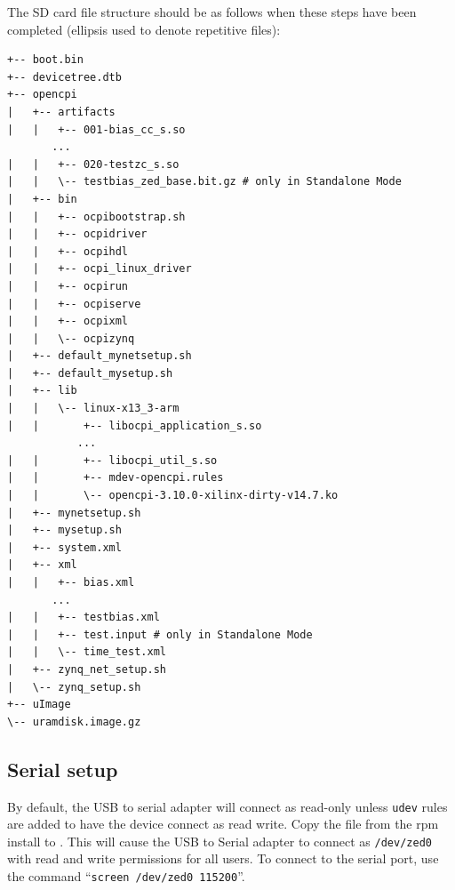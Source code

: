 \newpage
\begin{flushleft}
The SD card file structure should be as follows when these steps have been completed (ellipsis used to denote repetitive files):
\end{flushleft}
\begin{verbatim}
+-- boot.bin
+-- devicetree.dtb
+-- opencpi
|   +-- artifacts
|   |   +-- 001-bias_cc_s.so
       ...
|   |   +-- 020-testzc_s.so
|   |   \-- testbias_zed_base.bit.gz # only in Standalone Mode
|   +-- bin
|   |   +-- ocpibootstrap.sh
|   |   +-- ocpidriver
|   |   +-- ocpihdl
|   |   +-- ocpi_linux_driver
|   |   +-- ocpirun
|   |   +-- ocpiserve
|   |   +-- ocpixml
|   |   \-- ocpizynq
|   +-- default_mynetsetup.sh
|   +-- default_mysetup.sh
|   +-- lib
|   |   \-- linux-x13_3-arm
|   |       +-- libocpi_application_s.so
           ...
|   |       +-- libocpi_util_s.so
|   |       +-- mdev-opencpi.rules
|   |       \-- opencpi-3.10.0-xilinx-dirty-v14.7.ko
|   +-- mynetsetup.sh
|   +-- mysetup.sh
|   +-- system.xml
|   +-- xml
|   |   +-- bias.xml
       ...
|   |   +-- testbias.xml
|   |   +-- test.input # only in Standalone Mode
|   |   \-- time_test.xml
|   +-- zynq_net_setup.sh
|   \-- zynq_setup.sh
+-- uImage
\-- uramdisk.image.gz

\end{verbatim}

\subsection*{Serial setup}
By default, the USB to serial adapter will connect as read-only unless \texttt{udev} rules are added to have the device connect as read write.  Copy the file from the rpm install  to .  This will cause the USB to Serial adapter to connect as \texttt{/dev/zed0} with read and write permissions for all users.  To connect to the serial port, use the command ``\texttt{screen /dev/zed0 115200}''.
